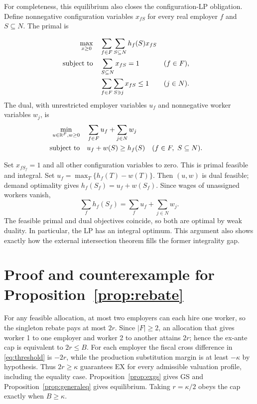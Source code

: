 \documentclass[11pt]{article}
\theoremstyle{definition}
\theoremstyle{remark}
\numberwithin{equation}{section}
\begin{document}
For completeness, this equilibrium also closes the configuration-LP obligation. Define nonnegative configuration variables $x_{fS}$ for every real employer $f$ and $S\subseteq N$. The primal is

\begin{align}
\max_{x\ge0}\quad&\sum_{f\in F}\sum_{S\subseteq N}h_f(S)x_{fS} \label{eq:primal}\\
\text{subject to}\quad&
 \sum_{S\subseteq N}x_{fS}=1 &&(f\in F),\notag\\
&\sum_{f\in F}\sum_{S\ni j}x_{fS}\le1 &&(j\in N).\notag
\end{align}
The dual, with unrestricted employer variables $u_f$ and nonnegative worker variables $w_j$, is
\begin{align}
\min_{u\in\mathbb R^F,w\ge0}\quad&
\sum_{f\in F}u_f+\sum_{j\in N}w_j \label{eq:dual}\\
\text{subject to}\quad&
u_f+w(S)\ge h_f(S) &&(f\in F,\ S\subseteq N).\notag
\end{align}

Set $x_{fS_f}=1$ and all other configuration variables to zero. This is primal feasible and integral. Set $u_f=\max_T\{h_f(T)-w(T)\}$. Then $(u,w)$ is dual feasible; demand optimality gives $h_f(S_f)=u_f+w(S_f)$. Since wages of unassigned workers vanish,
\[
\sum_f h_f(S_f)=\sum_f u_f+\sum_{j\in N}w_j.
\]
The feasible primal and dual objectives coincide, so both are optimal by weak duality. In particular, the LP has an integral optimum. This argument also shows exactly how the external intersection theorem fills the former integrality gap.

\section{Proof and counterexample for Proposition~\ref{prop:rebate}}\label{app:rebate}

For any feasible allocation, at most two employers can each hire one worker, so the singleton rebate pays at most $2r$. Since $|F|\ge2$, an allocation that gives worker 1 to one employer and worker 2 to another attains $2r$; hence the ex-ante cap is equivalent to $2r\le B$. For each employer the fiscal cross difference in \eqref{eq:threshold} is $-2r$, while the production substitution margin is at least $-\kappa$ by hypothesis. Thus $2r\ge\kappa$ guarantees EX for every admissible valuation profile, including the equality case. Proposition~\ref{prop:exgs} gives GS and Proposition~\ref{prop:generaleq} gives equilibrium. Taking $r=\kappa/2$ obeys the cap exactly when $B\ge\kappa$.
\end{document}
